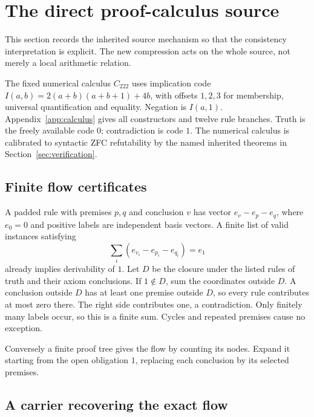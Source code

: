 \section{The direct proof-calculus source}
\label{sec:source}

This section records the inherited source mechanism
\cite{shared,flow} so that the consistency interpretation
is explicit. The new compression acts on the whole
source, not merely a local arithmetic relation.

The fixed numerical calculus $C_{222}$ uses implication
code $I(a,b)=2(a+b)(a+b+1)+4b$, with offsets $1,2,3$
for membership, universal quantification and equality.
Negation is $I(a,1)$. Appendix~\ref{app:calculus}
gives all constructors and twelve rule branches.
Truth is the freely available code $0$; contradiction
is code $1$. The numerical calculus is calibrated
to syntactic ZFC refutability by the named inherited
theorems in Section~\ref{sec:verification}.

\subsection{Finite flow certificates}

A padded rule with premises $p,q$ and conclusion $v$
has vector $e_v-e_p-e_q$, where $e_0=0$ and positive
labels are independent basis vectors. A finite list
of valid instances satisfying
\begin{equation}
 \sum_i(e_{v_i}-e_{p_i}-e_{q_i})=e_1
\label{eq:flow}
\end{equation}
already implies derivability of $1$.
Let $D$ be the closure under the listed rules of
truth and their axiom conclusions. If $1\notin D$,
sum the coordinates outside $D$. A conclusion
outside $D$ has at least one premise outside $D$,
so every rule contributes at most zero there.
The right side contributes one, a contradiction.
Only finitely many labels occur, so this is a
finite sum. Cycles and repeated premises cause
no exception.

Conversely a finite proof tree gives the flow by
counting its nodes. Expand it starting from the
open obligation $1$, replacing each conclusion
by its selected premises.

\subsection{A carrier recovering the exact flow}

